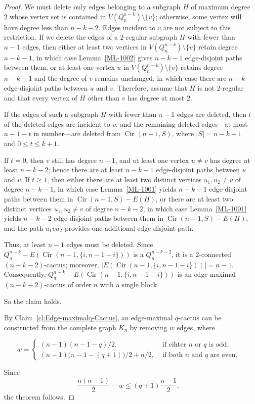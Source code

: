 \documentclass{article}
\begin{document}
\begin{proof}
We must delete only edges belonging to a subgraph \(H\) of maximum degree \(2\) whose vertex set is contained in \(V(Q_n^{n-k})\setminus\{v\}\); otherwise, some vertex will have degree less than \(n-k-2\). Edges incident to \(v\) are not subject to this restriction. If we delete the edges of a \(2\)-regular subgraph \(H\) with fewer than \(n-1\) edges, then either at least two vertices in \(V(Q_n^{n-k})\setminus\{v\}\) retain degree \(n-k-1\), in which case Lemma~\ref{ML-1002} gives \(n-k-1\) edge-disjoint paths between them, or at least one vertex \(u\) in \(V(Q_n^{n-k})\setminus\{v\}\) retains degree \(n-k-1\) and the degree of \(v\) remains unchanged, in which case there are \(n-k\) edge-disjoint paths between \(u\) and \(v\). Therefore, assume that \(H\) is not \(2\)-regular and that every vertex of \(H\) other than \(v\) has degree at most \(2\).

If the edges of such a subgraph \(H\) with fewer than \(n-1\) edges are deleted, then \(t\) of the deleted edges are incident to \(v\), and the remaining deleted edges—at most \(n-1-t\) in number—are deleted from \(\operatorname{Cir}(n-1,S)\), where \(|S|=n-k-1\) and \(0\le t\le k+1\).

If \(t=0\), then \(v\) still has degree \(n-1\), and at least one vertex \(u\neq v\) has degree at least \(n-k-2\); hence there are at least \(n-k-1\) edge-disjoint paths between \(u\) and \(v\). If \(t\ge 1\), then either there are at least two distinct vertices \(u_1,u_2\neq v\) of degree \(n-k-1\), in which case Lemma~\ref{ML-1001} yields \(n-k-1\) edge-disjoint paths between them in \(\operatorname{Cir}(n-1,S)-E(H)\), or there are at least two distinct vertices \(u_1,u_2\neq v\) of degree \(n-k-2\), in which case Lemma~\ref{ML-1001} yields \(n-k-2\) edge-disjoint paths between them in \(\operatorname{Cir}(n-1,S)-E(H)\), and the path \(u_1vu_2\) provides one additional edge-disjoint path.

Thus, at least \(n-1\) edges must be deleted. Since \(Q_n^{n-k}-E(\operatorname{Cir}(n-1,\{i,n-1-i\}))\) is a \(Q_n^{n-k-2}\), it is a \(2\)-connected \((n-k-2)\)-cactus; moreover, \(\bigl|E(\operatorname{Cir}(n-1,\{i,n-1-i\}))\bigr|=n-1\). Consequently, \(Q_n^{n-k}-E(\operatorname{Cir}(n-1,\{i,n-1-i\}))\) is an edge-maximal \((n-k-2)\)-cactus of order \(n\) with a single block.

So the claim holds.

By Claim~\ref{cl:Edge-maximalq-Cactus}, an edge-maximal \(q\)-cactus can be constructed from the complete graph \(K_n\) by removing \(w\) edges, where

\[
w = 
\begin{cases}
(n-1)(n-1-q)/2, & \text{ if eihter } n \text{ or } q \text{ is odd},\\
(n-1)\big(n-1-(q+1)\big)/2+n/2, & \text{ if both } n \text{ and } q \text{ are even}.
\end{cases}
\]

Since
\[
\frac{n(n-1)}{2}-w\le (q+1)\frac{n-1}{2},
\]
the theorem follows.

\end{proof}
\end{document}
